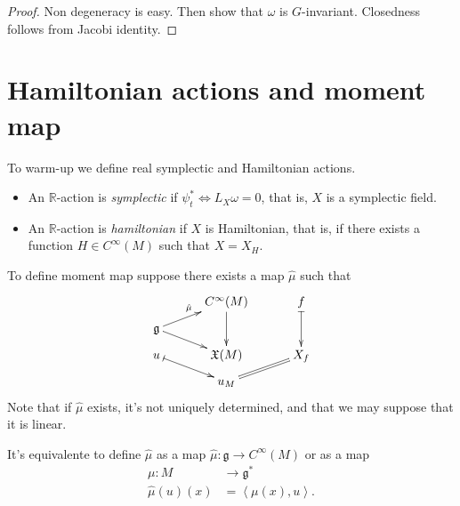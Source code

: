 \begin{proof}
Non degeneracy is easy.
Then show that $\omega$ is $G$-invariant.
Closedness follows from Jacobi identity.
\end{proof}

\section{Hamiltonian actions and moment map}
\label{section-hamiltonian-actions-and-moment-map}

\noindent
To warm-up we define real symplectic and Hamiltonian actions.

\begin{definition}
\label{definition-real-symplectic-and-hamiltonian-actions}
\begin{itemize}
\item An $\mathbb{R}$-action is {\it symplectic} if $\psi_t^* \iff L_X \omega=0$,
that is, $X$ is a symplectic field.
\item An $\mathbb{R}$-action is {\it hamiltonian} if $X$ is Hamiltonian,
that is, if there exists a function $H \in C^\infty(M)$ such that
$X=X_H$.
\end{itemize}
\end{definition}

\noindent
To define moment map suppose there exists a map $\hat{\mu}$ 
such that
$$
\xymatrixcolsep{3em}
\xymatrixrowsep{.7em}
\xymatrix{
&C^\infty(M)\ar[dd]&f\ar@{|->}[dd]\\
\mathfrak{g}\ar[dr]\ar[ur]^{\hat{\mu}}\\
u \ar@{|->}[dr] & \mathfrak{X}(M) & X_f\\
& u_M \ar@{=}[ur]
}
$$
Note that if  $\hat{\mu}$ exists, it's not uniquely determined,
and that we may suppose that it is linear.

It's equivalente to define $\hat{\mu}$ as a map 
$\hat{\mu}:\mathfrak{g}\to C^\infty(M)$ or as a map
\begin{align*}
\mu: M &\longrightarrow \mathfrak{g}^* \\
\hat{\mu}(u)(x) &= \left<\mu(x),u\right>.
\end{align*}

